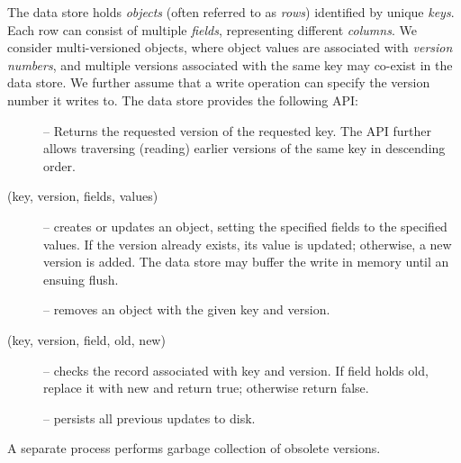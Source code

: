 The  data store holds  \emph{objects} (often referred to as \emph{rows}) identified by unique \emph{keys}.
Each row can consist of multiple \emph{fields}, representing different \emph{columns}. 
We consider multi-versioned objects, where object values are associated with \emph{version numbers}, and
multiple versions associated with the same key may co-exist in the data store.
We further assume that a write operation can specify the version number it writes to.
The  data store provides the following API:
\begin{description}
\item [] --  Returns the requested version of the requested key.
The API further allows traversing (reading) earlier versions of the same key in descending order.
\item [(key, version, fields, values)] -- 
creates or updates an object, setting the specified fields to the specified values. 
If the version already exists, its value is updated; otherwise, a new version is added. 
The data store may buffer the write in memory until an ensuing flush. 
\item [] -- removes an object with the given key and version.
\item [(key, version, field, old, new)] -- checks the record associated with key and version. 
If field holds old, replace it with new   and return true; otherwise return false.
\item [] -- persists all previous updates to disk.
\end{description}

A separate process performs garbage collection of obsolete versions.

